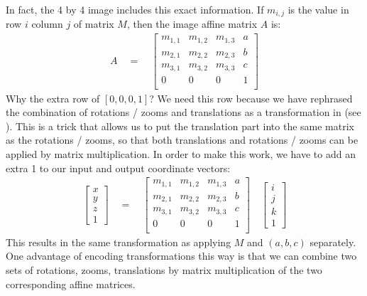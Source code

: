 \documentclass[letterpaper,10pt,english]{sphinxmanual}
\begin{document}
In fact, the 4 by 4 image  includes this exact information. If \(m_{i,j}\) is the value in row \(i\) column \(j\) of matrix \(M\), then the image affine matrix \(A\) is:
\begin{equation*}
\begin{split}
A
\quad
=
\quad
\begin{bmatrix}
m_{1,1} & m_{1,2} & m_{1,3} & a \\
m_{2,1} & m_{2,2} & m_{2,3} & b \\
m_{3,1} & m_{3,2} & m_{3,3} & c \\
0 & 0 & 0 & 1 \\
\end{bmatrix}
\end{split}
\end{equation*}
Why the extra row of \([0, 0, 0, 1]\)?  We need this row because we have rephrased the combination of rotations / zooms and translations as a transformation in  (see ). This is a trick that allows us to put the translation part into the same matrix as the rotations / zooms, so that both translations and rotations / zooms can be applied by matrix multiplication. In order to make this work, we have to add an extra 1 to our input and output coordinate vectors:
\begin{equation*}
\begin{split}
\begin{bmatrix}
x \\
y \\
z \\
1
\end{bmatrix}
\quad
=
\quad
\begin{bmatrix}
m_{1,1} & m_{1,2} & m_{1,3} & a \\
m_{2,1} & m_{2,2} & m_{2,3} & b \\
m_{3,1} & m_{3,2} & m_{3,3} & c \\
0 & 0 & 0 & 1 \\
\end{bmatrix}
\quad
\begin{bmatrix}
i \\
j \\
k \\
1
\end{bmatrix}
\end{split}
\end{equation*}
This results in the same transformation as applying \(M\) and \((a, b, c)\) separately. One advantage of encoding transformations this way is that we can combine two sets of rotations, zooms, translations by matrix multiplication of the two corresponding affine matrices.
\end{document}

